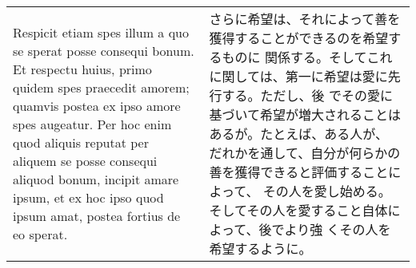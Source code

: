 \documentclass[10pt]{jsarticle}
\begin{document}
\begin{longtable}{p{21em}p{21em}}
\\

Respicit etiam spes illum a quo se sperat posse consequi
bonum. Et respectu huius, primo quidem spes praecedit amorem; quamvis
postea ex ipso amore spes augeatur. Per hoc enim quod aliquis reputat
per aliquem se posse consequi aliquod bonum, incipit amare ipsum, et
ex hoc ipso quod ipsum amat, postea fortius de eo sperat.

 &

 さらに希望は、それによって善を獲得することができるのを希望するものに
 関係する。そしてこれに関しては、第一に希望は愛に先行する。ただし、後
 でその愛に基づいて希望が増大されることはあるが。たとえば、ある人が、
 だれかを通して、自分が何らかの善を獲得できると評価することによって、
 その人を愛し始める。そしてその人を愛すること自体によって、後でより強
 くその人を希望するように。

\end{longtable}
\end{document}
